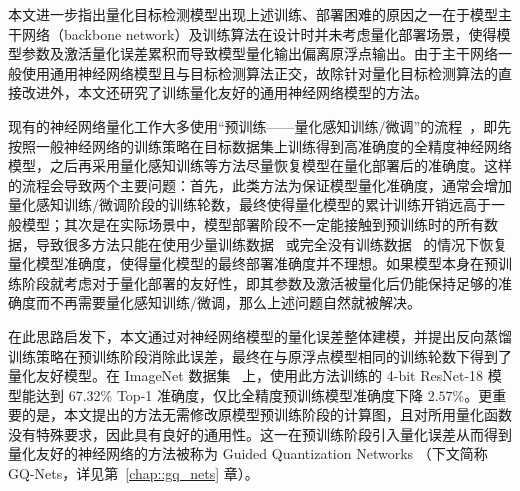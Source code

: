 \documentclass[
]{shtthesis}
\begin{document}
本文进一步指出量化目标检测模型出现上述训练、部署困难的原因之一在于模型主干网络（backbone network）及训练算法在设计时并未考虑量化部署场景，使得模型参数及激活量化误差累积而导致模型量化输出偏离原浮点输出。由于主干网络一般使用通用神经网络模型且与目标检测算法正交，故除针对量化目标检测算法的直接改进外，本文还研究了训练量化友好的通用神经网络模型的方法。

现有的神经网络量化工作大多使用“预训练——量化感知训练/微调”的流程~\citep{jacob2018quantization, krishnamoorthi2018quantizing, jung2019learning, li2019additive}，即先按照一般神经网络的训练策略在目标数据集上训练得到高准确度的全精度神经网络模型，之后再采用量化感知训练等方法尽量恢复模型在量化部署后的准确度。这样的流程会导致两个主要问题：首先，此类方法为保证模型量化准确度，通常会增加量化感知训练/微调阶段的训练轮数，最终使得量化模型的累计训练开销远高于一般模型；其次是在实际场景中，模型部署阶段不一定能接触到预训练时的所有数据，导致很多方法只能在使用少量训练数据~\citep{he2018learning} 或完全没有训练数据~\citep{nagel2019data, meller2019same} 的情况下恢复量化模型准确度，使得量化模型的最终部署准确度并不理想。如果模型本身在预训练阶段就考虑对于量化部署的友好性，即其参数及激活被量化后仍能保持足够的准确度而不再需要量化感知训练/微调，那么上述问题自然就被解决。

在此思路启发下，本文通过对神经网络模型的量化误差整体建模，并提出反向蒸馏训练策略在预训练阶段消除此误差，最终在与原浮点模型相同的训练轮数下得到了量化友好模型。在 ImageNet 数据集~\citep{ILSVRC15} 上，使用此方法训练的 4-bit ResNet-18 模型能达到 $67.32\%$ Top-1 准确度，仅比全精度预训练模型准确度下降 $2.57\%$。更重要的是，本文提出的方法无需修改原模型预训练阶段的计算图，且对所用量化函数没有特殊要求，因此具有良好的通用性。这一在预训练阶段引入量化误差从而得到量化友好的神经网络的方法被称为 Guided Quantization Networks （下文简称 GQ-Nets，详见第~\ref{chap::gq_nets} 章）。
\end{document}
